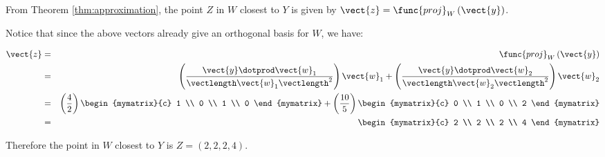 \begin{solution}
From Theorem \ref{thm:approximation}, the point $Z$ in $W$ closest to
$Y$ is given by $\vect{z} = \func{proj}_{W}\left( \vect{y}\right)$.

Notice that since the above vectors already give an orthogonal basis for $W$, we have:

\begin{eqnarray*}
\vect{z} &=& \func{proj}_{W}\left( \vect{y}\right)\\
&=&
\left( \frac{\vect{y} \dotprod \vect{w}_1}{ \vectlength \vect{w}_1 \vectlength^2}\right) \vect{w}_1
+
\left( \frac{\vect{y} \dotprod \vect{w}_2}{ \vectlength \vect{w}_2 \vectlength^2}\right) \vect{w}_2 \\
&=& 
\left( \frac{4}{2} \right) \begin{mymatrix}{c}
1 \\
0 \\
1 \\
0 
\end{mymatrix}
+
\left( \frac{10}{5} \right)
\begin{mymatrix}{c}
0 \\
1 \\
0 \\
2
\end{mymatrix} \\
&=& 
\begin{mymatrix}{c}
2 \\
2 \\
2 \\
4 
\end{mymatrix}
\end{eqnarray*} 

Therefore the point in $W$ closest to $Y$ is $Z = (2,2,2,4)$. \\


\end{solution}
